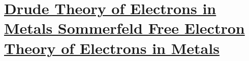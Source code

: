 \section[Drude Theory of Electrons in Metals Sommerfeld Free Electron Theory of Electrons in Metals]{\hyperlink{toc}{Drude Theory of Electrons in Metals Sommerfeld Free Electron Theory of Electrons in Metals}}